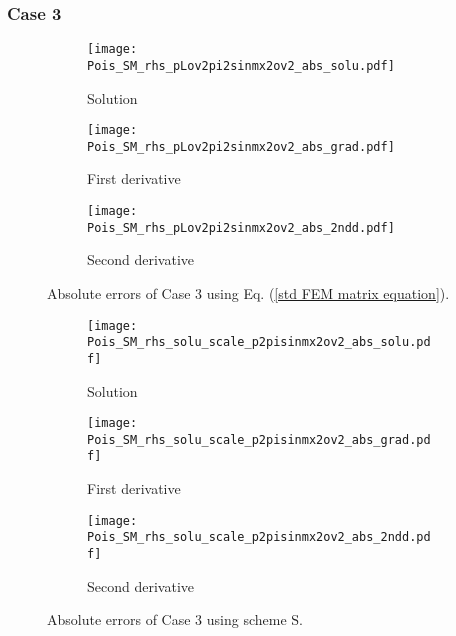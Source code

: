 \documentclass[final,3p]{elsarticle}
\begin{document}
\pagebreak
\subsubsection{Case 3}

\begin{figure}[!ht]
    \begin{subfigure}{5.5cm}
        \texttt{[image: Pois\_SM\_rhs\_pLov2pi2sinmx2ov2\_abs\_solu.pdf]}
        \caption{Solution}
        \label{Fig:Pois_SM_rhs_pLov2pi2sinmx2ov2_abs_solu}
    \end{subfigure}
    \begin{subfigure}{5.5cm}
        \texttt{[image: Pois\_SM\_rhs\_pLov2pi2sinmx2ov2\_abs\_grad.pdf]}
        \caption{First derivative}
        \label{Fig:Pois_SM_rhs_pLov2pi2sinmx2ov2_abs_grad}
    \end{subfigure}
    \begin{subfigure}{5.5cm}
        \texttt{[image: Pois\_SM\_rhs\_pLov2pi2sinmx2ov2\_abs\_2ndd.pdf]}
        \caption{Second derivative}
        \label{Fig:Pois_SM_rhs_pLov2pi2sinmx2ov2_abs_2ndd}
    \end{subfigure}
\caption{Absolute errors of Case 3 using Eq. (\ref{std FEM matrix equation}).}
\label{Pois_SM_rhs_pLov2pi2sinmx2ov2_abs}
\end{figure}

\begin{figure}[!ht]
    \begin{subfigure}{5.5cm}
        \texttt{[image: Pois\_SM\_rhs\_solu\_scale\_p2pisinmx2ov2\_abs\_solu.pdf]}
        \caption{Solution}
        \label{Fig:Pois_SM_rhs_solu_scale_p2pisinmx2ov2_abs_solu}
    \end{subfigure}
    \begin{subfigure}{5.5cm}
        \texttt{[image: Pois\_SM\_rhs\_solu\_scale\_p2pisinmx2ov2\_abs\_grad.pdf]}
        \caption{First derivative}
        \label{Fig:Pois_SM_rhs_solu_scale_p2pisinmx2ov2_abs_grad}
    \end{subfigure}
    \begin{subfigure}{5.5cm}
        \texttt{[image: Pois\_SM\_rhs\_solu\_scale\_p2pisinmx2ov2\_abs\_2ndd.pdf]}
        \caption{Second derivative}
        \label{Fig:Pois_SM_rhs_solu_scale_p2pisinmx2ov2_abs_2ndd}
    \end{subfigure}
\caption{Absolute errors of Case 3 using scheme $\text{S}$.}
\label{Pois_SM_rhs_solu_scale_p2pisinmx2ov2_abs}
\end{figure}
\end{document}
